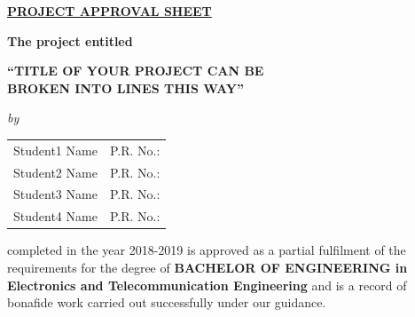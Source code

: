 \begin{center}
%
\underline{\bfseries \huge PROJECT APPROVAL SHEET}\\
\vspace{0.4cm}
\begin{figure}[H]
{\centering {}\par}
\end{figure}
\vspace{-0.6cm}
{\bfseries The project entitled}\\
\vspace{0.2cm}
\begin{large}
{\bfseries ``TITLE OF YOUR PROJECT CAN BE\\BROKEN INTO LINES THIS WAY''}\\
\end{large}
\vspace{0.1cm}
\begin{small}
\emph{by}\\
\end{small}
\vspace{0.1cm}
\begin{table}[H]
\normalsize
\bfseries
\begin{center}
\begin{tabular}{ll}
Student1  Name \hspace{1cm} & P.R. No.:\\
Student2  Name & P.R. No.:\\
Student3  Name & P.R. No.:\\
Student4  Name & P.R. No.:\\
\end{tabular}
\end{center}
\end{table}
\vspace{-1.6cm}
\end{center}
\noindent completed in the year 2018-2019 is approved as a partial fulfilment of the requirements for the degree of {\bfseries BACHELOR OF ENGINEERING in Electronics and Telecommunication Engineering} and is a record of bonafide work carried out successfully under our guidance.\\




